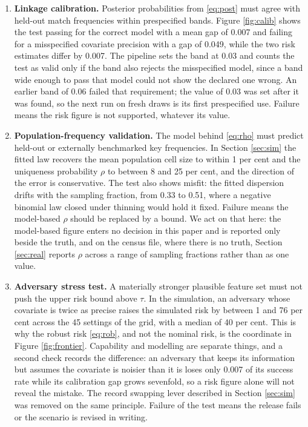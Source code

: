 \documentclass[11pt,a4paper]{article}
\theoremstyle{plain}
\theoremstyle{definition}
\theoremstyle{definition}
\theoremstyle{plain}
\begin{document}
\begin{enumerate}
\item \textbf{Linkage calibration.} Posterior probabilities from \eqref{eq:post}
must agree with held-out match frequencies within prespecified bands. Figure
\ref{fig:calib} shows the test passing for the correct model with a mean gap of
0.007 and failing for a misspecified covariate precision with a gap of 0.049,
while the two risk estimates differ by 0.007. The pipeline sets the band at 0.03 and
counts the test as valid only if the band also rejects the misspecified model, since a
band wide enough to pass that model could not show the declared one wrong. An earlier
band of 0.06 failed that requirement; the value of 0.03 was set after it was found, so
the next run on fresh draws is its first prespecified use. Failure means the risk
figure is not supported, whatever its value.

\item \textbf{Population-frequency validation.} The model behind
\eqref{eq:rho} must predict held-out or externally benchmarked key frequencies.
In Section \ref{sec:sim} the fitted law recovers the mean population cell size
to within 1 per cent and the uniqueness probability $\rho$ to between 8 and 25
per cent, and the direction of the error is conservative. The test also shows
misfit: the fitted dispersion drifts with the sampling fraction, from 0.33 to
0.51, where a negative binomial law closed under thinning would hold it fixed.
Failure means the model-based $\rho$ should be replaced by a bound. We act on
that here: the model-based figure enters no decision in this paper and is
reported only beside the truth, and on the census file, where there is no truth,
Section \ref{sec:real} reports $\rho$ across a range of sampling fractions
rather than as one value.

\item \textbf{Adversary stress test.} A materially stronger plausible feature
set must not push the upper risk bound above $\tau$. In the simulation, an adversary whose
covariate is twice as precise raises the simulated risk by between 1 and 76 per
cent across the 45 settings of the grid, with a median of 40 per cent. This is
why the robust risk \eqref{eq:rob}, and not the nominal risk, is the coordinate
in Figure \ref{fig:frontier}. Capability and modelling are separate things, and
a second check records the difference: an adversary that keeps its information
but assumes the covariate is noisier than it is loses only 0.007 of its success
rate while its calibration gap grows sevenfold, so a risk figure alone will not
reveal the mistake. The record swapping lever described in Section
\ref{sec:sim} was removed on the same principle. Failure of the test means the
release fails or the scenario is revised in writing.


\end{enumerate}
\end{document}

